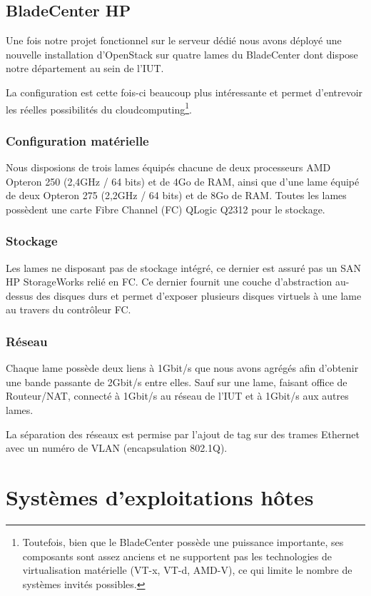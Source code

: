 \documentclass[a4paper,oneside]{report}
\begin{document}
\section{BladeCenter HP}
Une fois notre projet fonctionnel sur le serveur dédié nous avons déployé une nouvelle installation d'OpenStack sur quatre lames du BladeCenter dont dispose notre département au sein de l'IUT.

La configuration est cette fois-ci beaucoup plus intéressante et permet d'entrevoir les réelles possibilités du \gls{cloudcomputing}\footnote{Toutefois, bien que le BladeCenter possède une puissance importante, ses composants sont assez anciens et ne supportent pas les technologies de \gls{virtualisation} matérielle (VT-x, VT-d, AMD-V), ce qui limite le nombre de systèmes invités possibles.}.

\subsection{Configuration matérielle}
Nous disposions de trois lames équipés chacune de deux processeurs AMD Opteron 250 (2,4GHz / 64 bits) et de 4Go de RAM, ainsi que d'une lame équipé de deux Opteron 275 (2,2GHz / 64 bits) et de 8Go de RAM.\newline
Toutes les lames possèdent une carte Fibre Channel (FC) QLogic Q2312 pour le stockage.

\subsection{Stockage}
Les lames ne disposant pas de stockage intégré, ce dernier est assuré pas un SAN HP StorageWorks relié en FC.
Ce dernier fournit une couche d'abstraction au-dessus des disques durs et permet d'exposer plusieurs disques \og virtuels \fg à une lame au travers du contrôleur FC.

\subsection{Réseau}
Chaque lame possède deux liens à 1Gbit/s que nous avons agrégés afin d'obtenir une bande passante de 2Gbit/s entre elles.
Sauf sur une lame, faisant office de Routeur/NAT, connecté à 1Gbit/s au réseau de l'IUT et à 1Gbit/s aux autres lames.

La séparation des réseaux est permise par l'ajout de tag sur des trames Ethernet avec un numéro de VLAN (encapsulation 802.1Q).


\chapter{Systèmes d'exploitations hôtes}
\end{document}
